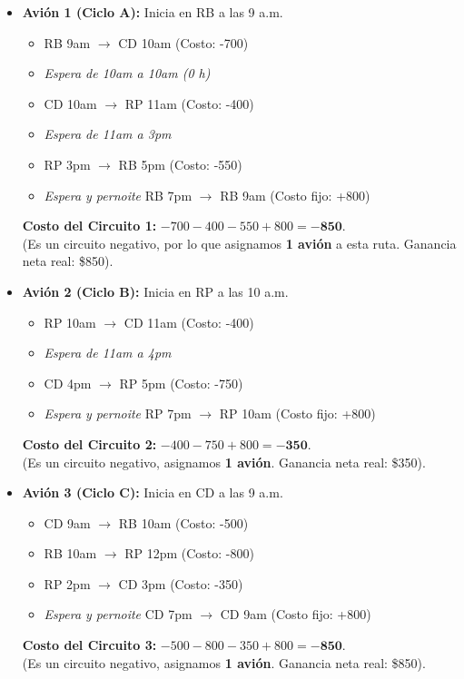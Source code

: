 \documentclass[10pt,a4paper]{article}
\begin{document}
\begin{itemize}
    \item \textbf{Avión 1 (Ciclo A):} Inicia en RB a las 9 a.m.
    \begin{itemize}
        \item RB 9am $\to$ CD 10am (Costo: -700)
        \item \textit{Espera de 10am a 10am (0 h)}
        \item CD 10am $\to$ RP 11am (Costo: -400)
        \item \textit{Espera de 11am a 3pm}
        \item RP 3pm $\to$ RB 5pm (Costo: -550)
        \item \textit{Espera y pernoite} RB 7pm $\to$ RB 9am (Costo fijo: +800)
    \end{itemize}
    \textbf{Costo del Circuito 1:} $-700 - 400 - 550 + 800 = \mathbf{-850}$. \\
    (Es un circuito negativo, por lo que asignamos \textbf{1 avión} a esta ruta. Ganancia neta real: \$850).

    \item \textbf{Avión 2 (Ciclo B):} Inicia en RP a las 10 a.m.
    \begin{itemize}
        \item RP 10am $\to$ CD 11am (Costo: -400)
        \item \textit{Espera de 11am a 4pm}
        \item CD 4pm $\to$ RP 5pm (Costo: -750)
        \item \textit{Espera y pernoite} RP 7pm $\to$ RP 10am (Costo fijo: +800)
    \end{itemize}
    \textbf{Costo del Circuito 2:} $-400 - 750 + 800 = \mathbf{-350}$. \\
    (Es un circuito negativo, asignamos \textbf{1 avión}. Ganancia neta real: \$350).

    \item \textbf{Avión 3 (Ciclo C):} Inicia en CD a las 9 a.m.
    \begin{itemize}
        \item CD 9am $\to$ RB 10am (Costo: -500)
        \item RB 10am $\to$ RP 12pm (Costo: -800)
        \item RP 2pm $\to$ CD 3pm (Costo: -350)
        \item \textit{Espera y pernoite} CD 7pm $\to$ CD 9am (Costo fijo: +800)
    \end{itemize}
    \textbf{Costo del Circuito 3:} $-500 - 800 - 350 + 800 = \mathbf{-850}$. \\
    (Es un circuito negativo, asignamos \textbf{1 avión}. Ganancia neta real: \$850).
\end{itemize}
\end{document}
